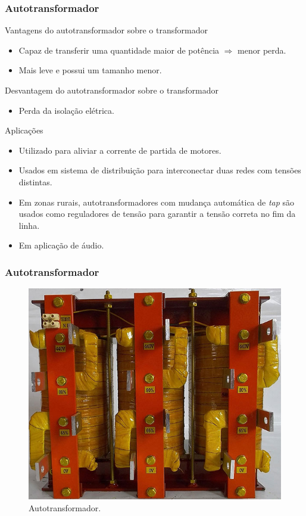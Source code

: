 \documentclass[mathserif,usenames,dvipsnames]{beamer}
\begin{document}
\begin{frame}
\frametitle{Autotransformador}
	\vspace{-0.2cm}
	\begin{block}{Vantagens do autotransformador sobre o transformador}
		\small
		\begin{itemize}
			\item Capaz de transferir uma quantidade maior de potência $\Rightarrow$ menor perda.
			\item Mais leve e possui um tamanho menor.
		\end{itemize}
	\end{block}
	\vspace{-0.1cm}
	\begin{block}{Desvantagem do autotransformador sobre o transformador}
		\small
		\begin{itemize}
			\item Perda da isolação elétrica.
		\end{itemize}
	\end{block}
	\vspace{-0.1cm}
	\begin{block}{Aplicações}
		\small
		\begin{itemize}
			\item Utilizado para aliviar a corrente de partida de motores.
			\item Usados em sistema de distribuição para interconectar duas redes com tensões distintas.
			\item Em zonas rurais, autotransformadores com mudança automática de \textit{tap} são usados como reguladores de tensão para garantir a tensão correta no fim da linha.
			\item Em aplicação de áudio.
		\end{itemize}		
	\end{block}
\end{frame}

\begin{frame}
\frametitle{Autotransformador}
	
	\begin{figure}
		\centering
		\includegraphics[width=0.7\linewidth]{figuras/autotrafo}
		\caption{Autotransformador.}
		\label{fig:autotrafo}
	\end{figure}
	
\end{frame}
\end{document}
